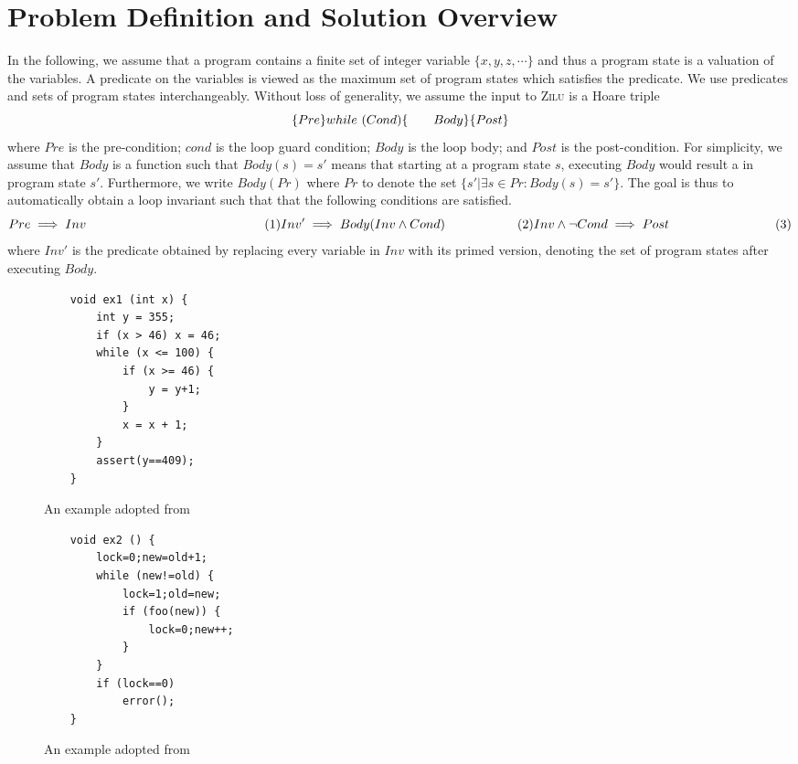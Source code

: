 
\section{Problem Definition and Solution Overview}
In the following, we assume that a program contains a finite set of integer variable $\{x,y,z,\cdots\}$ and thus a program state is a valuation of the variables. A predicate on the variables is viewed as the maximum set of program states which satisfies the predicate. We use predicates and sets of program states interchangeably. Without loss of generality, we assume the input to \textsc{Zilu} is a Hoare triple
\[
\{Pre\} \\
while~(Cond) \{ \\
~~~~~~Body \\
\} \\
\{Post\}
\]
where $Pre$ is the pre-condition; $cond$ is the loop guard condition; $Body$ is the loop body; and $Post$ is the post-condition. For simplicity, we assume that $Body$ is a function such that $Body(s) = s'$ means that starting at a program state $s$, executing $Body$ would result a in program state $s'$. Furthermore, we write $Body(Pr)$ where $Pr$ to denote the set $\{s' | \exists s \in Pr: Body(s) = s'\}$. The goal is thus to automatically obtain a loop invariant such that that the following conditions are satisfied.
\[
Pre \implies Inv ~~~~~~~~~~~~~~~~~~~~~~~~~~~~~~~~~~~~~~~~~~(1) \\
Inv' \implies Body(Inv \land Cond) ~~~~~~~~~~~~~~~~~ (2) \\
Inv \land \neg Cond \implies Post ~~~~~~~~~~~~~~~~~~~~~~~~~ (3)
\]
where $Inv'$ is the predicate obtained by replacing every variable in $Inv$ with its primed version, denoting the set of program states after executing $Body$.

\begin{figure}[t]
\centering
\begin{minipage}{.5\textwidth}
  \centering
{\scriptsize
\begin{verbatim}
    void ex1 (int x) {
        int y = 355;
        if (x > 46) x = 46;
        while (x <= 100) {
            if (x >= 46) {
                y = y+1;
            }
            x = x + 1;
        }
        assert(y==409);
    }
\end{verbatim}}
  \caption{An example adopted from~\cite{DBLP:conf/popl/GulwaniJ07}}
  \label{fig:test1}
\end{minipage}%
\begin{minipage}{.5\textwidth}
  \centering
{\scriptsize\begin{verbatim}
    void ex2 () {
        lock=0;new=old+1;
        while (new!=old) {
            lock=1;old=new;
            if (foo(new)) {
                lock=0;new++;
            }
        }
        if (lock==0)
            error();
    }
\end{verbatim}}
  \caption{An example adopted from~\cite{DBLP:conf/popl/HenzingerJMS02}}
  \label{fig:test2}
\end{minipage}
\end{figure}

